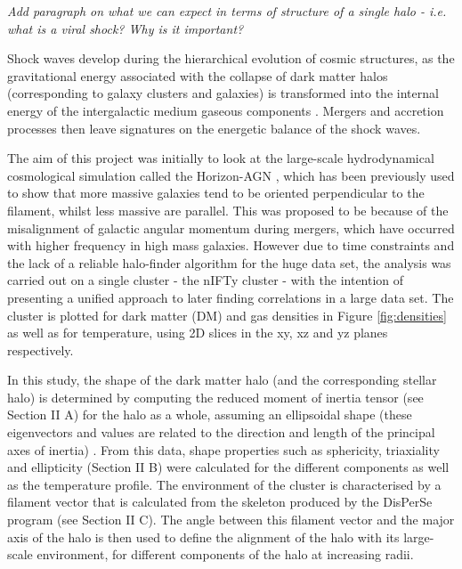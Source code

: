 \documentclass[journal]{IEEEtran}
\begin{document}

\textit{Add paragraph on what we can expect in terms of structure of a single halo - i.e. what is a viral shock? Why is it important?}

Shock waves develop during the hierarchical evolution of cosmic structures, as the gravitational energy associated with the collapse of dark matter halos (corresponding to galaxy clusters and galaxies) is transformed into the internal energy of the intergalactic medium gaseous components \cite{planelles13}. Mergers and accretion processes then leave signatures on the energetic balance of the shock waves. 



The aim of this project was initially to look at the large-scale hydrodynamical cosmological simulation called the Horizon-AGN \cite{dubois14}, which has been previously used to show that more massive galaxies tend to be oriented perpendicular to the filament, whilst less massive are parallel. This was proposed to be because of the misalignment of galactic angular momentum during mergers, which have occurred with higher frequency in high mass galaxies. However due to time constraints and the lack of a reliable halo-finder algorithm for the huge data set, the analysis was carried out on a single cluster - the nIFTy cluster \cite{nifty}- with the intention of presenting a unified approach to later finding correlations in a large data set. The cluster is plotted for dark matter (DM) and gas densities in Figure \ref{fig:densities} as well as for temperature, using 2D slices in the xy, xz and yz planes respectively. 

In this study, the shape of the dark matter halo (and the corresponding stellar halo) is determined by computing the reduced moment of inertia tensor (see Section II A) for the halo as a whole, assuming an ellipsoidal shape (these eigenvectors and values are related to the direction and length of the principal axes of inertia) \cite{hahn07a}. From this data, shape properties such as sphericity, triaxiality and ellipticity (Section II B) were calculated for the different components as well as the temperature profile. The environment of the cluster is characterised by a filament vector that is calculated from the skeleton produced by the DisPerSe program (see Section II C). The angle between this filament vector and the major axis of the halo is then used to define the alignment of the halo with its large-scale environment, for different components of the halo at increasing radii. 
\end{document}
